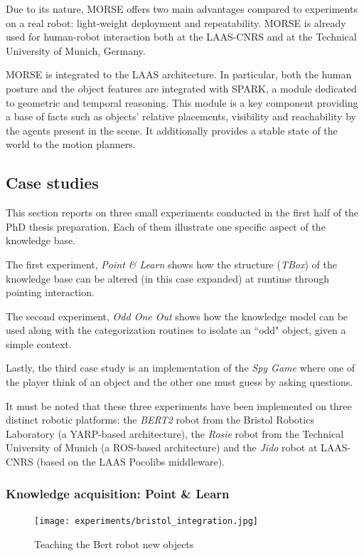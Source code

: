 Due to its nature, MORSE offers two main advantages compared to experiments on
a real robot: light-weight deployment and repeatability. MORSE is already used
for human-robot interaction both at the LAAS-CNRS and at the Technical
University of Munich, Germany.

MORSE is integrated to the LAAS architecture.  In particular, both the human
posture and the object features are integrated with SPARK, a
module dedicated to geometric and temporal reasoning.  This module is a key
component providing a base of facts such as objects' relative placements,
visibility and reachability by the agents present in the scene. It additionally
provides a stable state of the world to the motion planners.

\subsection{Case studies}
\label{sect|casestudies}

This section reports on three small experiments conducted in the first half of
the PhD thesis preparation. Each of them illustrate one specific aspect of the
knowledge base.

The first experiment, \emph{Point \& Learn} shows how the structure
(\emph{TBox}) of the knowledge base can be altered (in this case expanded) at
runtime through pointing interaction.

The second experiment, \emph{Odd One Out} shows how the knowledge model can be
used along with the categorization routines to isolate an ``odd" object, given
a simple context.

Lastly, the third case study is an implementation of the \emph{Spy Game} where
one of the player think of an object and the other one must guess by asking
questions.

It must be noted that these three experiments have been implemented on three
distinct robotic platforms: the \textit{BERT2} robot from the Bristol Robotics
Laboratory (a YARP-based architecture), the \textit{Rosie} robot from the
Technical University of Munich (a ROS-based architecture) and the \textit{Jido}
robot at LAAS-CNRS (based on the LAAS Pocolibs middleware).

\subsubsection{Knowledge acquisition: Point \& Learn}
\label{expe|pointandlearn}

\begin{figure}
\centering

\centering
  \texttt{[image: experiments/bristol\_integration.jpg]}
  \caption{Teaching the Bert robot new objects}
  \label{fig|bristol}

\end{figure}

